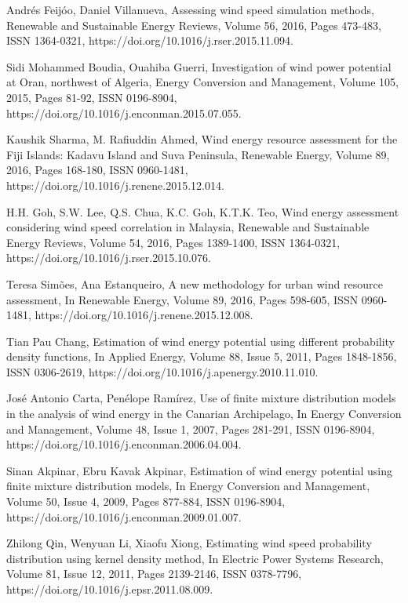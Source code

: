 \begin{thebibliography}{99}
\begin{singlespace}
Andrés Feijóo, Daniel Villanueva, Assessing wind speed simulation methods, Renewable and Sustainable Energy Reviews, Volume  56, 2016, Pages 473-483, ISSN 1364-0321, https://doi.org/10.1016/j.rser.2015.11.094.

Sidi Mohammed Boudia, Ouahiba Guerri, Investigation of wind power potential at Oran, northwest of Algeria, Energy Conversion and Management, Volume 105, 2015, Pages 81-92, ISSN 0196-8904, https://doi.org/10.1016/j.enconman.2015.07.055.

Kaushik Sharma, M. Rafiuddin Ahmed, Wind energy resource assessment for the Fiji Islands: Kadavu Island and Suva Peninsula, Renewable Energy, Volume 89, 2016, Pages 168-180, ISSN 0960-1481, https://doi.org/10.1016/j.renene.2015.12.014. 

H.H. Goh, S.W. Lee, Q.S. Chua, K.C. Goh, K.T.K. Teo, Wind energy assessment considering wind speed correlation in Malaysia, Renewable and Sustainable Energy Reviews, Volume 54, 2016, Pages 1389-1400, ISSN 1364-0321, https://doi.org/10.1016/j.rser.2015.10.076.

Teresa Simões, Ana Estanqueiro, A new methodology for urban wind resource assessment, In Renewable Energy, Volume 89, 2016, Pages 598-605, ISSN 0960-1481, https://doi.org/10.1016/j.renene.2015.12.008.

Tian Pau Chang, Estimation of wind energy potential using different probability density functions, In Applied Energy, Volume 88, Issue 5, 2011, Pages 1848-1856, ISSN 0306-2619, https://doi.org/10.1016/j.apenergy.2010.11.010.

José Antonio Carta, Penélope Ramírez, Use of finite mixture distribution models in the analysis of wind energy in the Canarian Archipelago, In Energy Conversion and Management, Volume 48, Issue 1, 2007, Pages 281-291, ISSN 0196-8904, https://doi.org/10.1016/j.enconman.2006.04.004.

Sinan Akpinar, Ebru Kavak Akpinar, Estimation of wind energy potential using finite mixture distribution models, In Energy Conversion and Management, Volume 50, Issue 4, 2009, Pages 877-884, ISSN 0196-8904, https://doi.org/10.1016/j.enconman.2009.01.007.

Zhilong Qin, Wenyuan Li, Xiaofu Xiong, Estimating wind speed probability distribution using kernel density method, In Electric Power Systems Research, Volume 81, Issue 12, 2011, Pages 2139-2146, ISSN 0378-7796, https://doi.org/10.1016/j.epsr.2011.08.009.


\end{singlespace}
\end{thebibliography}
